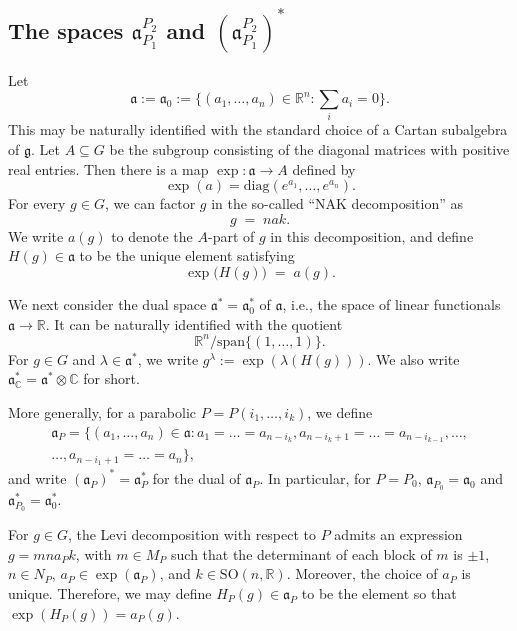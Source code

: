 \documentclass[11pt]{amsart}
\def\R{\mathbb{R}}
\numberwithin{theorem}{section}
\numberwithin{equation}{section}
\theoremstyle{remark}
\theoremstyle{definition}
\newcommand{\C}{\mathbb{C}}
\newcommand{\spn}{\mathrm{span}}
\newcommand{\ga}{\mathfrak{a}}
\newcommand{\Lg}{\mathfrak{g}}
\newcommand{\diag}{\mathrm{diag}}
\begin{document}
\subsection{The spaces $\ga_{P_1}^{P_2}$ and $(\ga_{P_1}^{P_2})^*$} \label{sec:spaces}

Let
\begin{equation*}
\ga := \ga_0 := \Big\{(a_1,\ldots,a_n) \in \R^n : \sum_i a_i = 0\Big\}.
\end{equation*}
This may be naturally identified with the standard choice of a Cartan subalgebra of $\Lg$.
Let $A \subseteq G$ be the subgroup consisting of the diagonal matrices with positive real entries. Then there is a map $\exp: \ga \rightarrow A$ defined by
\begin{equation*}
\exp(a) = \diag(e^{a_1}, \ldots, e^{a_n}).
\end{equation*}
For every \(g \in G\), we can factor \(g\) in the so-called ``NAK decomposition'' as
\[
  g \;=\; nak.
\] We write \(a(g)\) to denote the \(A\)-part of \(g\) in this decomposition, and define \(H(g) \in \ga\) to be the unique element satisfying
\[
  \exp\bigl(H(g)\bigr) \;=\; a(g).
\]

We next consider the dual space $\ga^* = \ga_0^*$ of $\ga$, i.e., the space of linear functionals $\ga \rightarrow \R$. It can be naturally identified with the quotient
\begin{equation*}
\R^n / \spn\{(1,\ldots,1)\}.
\end{equation*}
For $g \in G$ and $\lambda \in \ga^*$, we write $g^\lambda := \exp(\lambda(H(g)))$. We also write $\ga^*_\C = \ga^* \otimes \C$ for short.

More generally, for a parabolic $P=P(i_1,\dots, i_k)$, we define
\begin{align*}
\ga_P = \{(a_1,\ldots,a_n) \in \ga : a_1 = \ldots = a_{n-i_k}, a_{n-i_k+1} = \ldots = a_{n-i_{k-1}}, \ldots, \\
\ldots, a_{n-i_1+1} = \ldots = a_{n}\},
\end{align*}
and write $(\ga_P)^* =\ga_P^* $ for the dual of $\ga_P$. In particular, for $P = P_0$, $\ga_{P_0} = \ga_0$ and $\ga_{P_0}^* = \ga_0^*$.

For $g \in G$, the Levi decomposition with respect to $P$ admits an expression $g=mna_Pk$, with $m \in M_P$ such that the determinant of each block of $m$ is $\pm 1$, $n \in N_P$, $a_P \in \exp(\mathfrak a_P)$, and $k \in \mathrm{SO}(n,\R)$. Moreover, the choice of $a_P$ is unique. Therefore, we may define $H_P(g) \in \mathfrak a_P$ to be the element so that $\exp(H_P(g)) = a_P(g)$.
\end{document}
